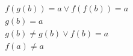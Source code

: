 \begin{align*}
%
& f(g(b)) = a \lor f(f(b)) = a
~\\~
& g(b) = a
~\\~
& g(b)  \neq  g(b) \lor f(b) = a
~\\~
& f(a)  \neq  a
%
\end{align*}
